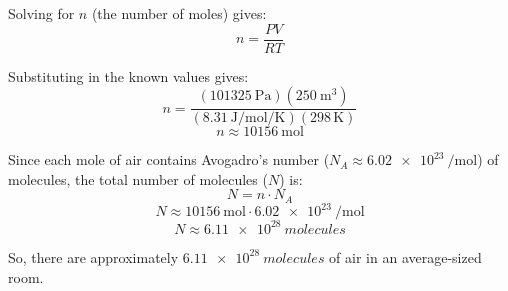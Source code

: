 \documentclass[12pt]{article}
\begin{document}
Solving for \(n\) (the number of moles) gives:
\[
n = \frac{PV}{RT}
\]

Substituting in the known values gives:
\[
n = \frac{(\SI{101325}{\pascal})(\SI{250}{\meter\cubed})}{(\SI{8.31}{\joule\per\mole\per\kelvin})(298 \, \text{K})}
\]
\[
n \approx \SI{10156}{\mole}
\]

Since each mole of air contains Avogadro's number (\(N_A \approx \SI{6.02e23}{\per\mole}\)) of molecules, the total number of molecules (\(N\)) is:
\[
N = n \cdot N_A
\]
\[
N \approx \SI{10156}{\mole} \cdot \SI{6.02e23}{\per\mole}
\]
\[
N \approx \SI{6.11e28}{molecules}
\]

So, there are approximately \(\SI{6.11e28}{molecules}\) of air in an average-sized room.
\end{document}
